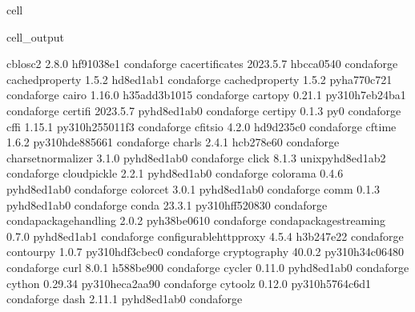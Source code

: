 \documentclass[letterpaper,table,10pt,english]{jupyterBook}
\begin{document}
\begin{sphinxuseclass}{cell}
\begin{sphinxVerbatimOutput}
\begin{sphinxuseclass}{cell_output}
\begin{sphinxVerbatim}[commandchars=\\\{\}]
c\PYGZhy{}blosc2                  2.8.0                hf91038e\PYGZus{}1    conda\PYGZhy{}forge
ca\PYGZhy{}certificates           2023.5.7             hbcca054\PYGZus{}0    conda\PYGZhy{}forge
cached\PYGZhy{}property           1.5.2                hd8ed1ab\PYGZus{}1    conda\PYGZhy{}forge
cached\PYGZus{}property           1.5.2              pyha770c72\PYGZus{}1    conda\PYGZhy{}forge
cairo                     1.16.0            h35add3b\PYGZus{}1015    conda\PYGZhy{}forge
cartopy                   0.21.1          py310h7eb24ba\PYGZus{}1    conda\PYGZhy{}forge
certifi                   2023.5.7           pyhd8ed1ab\PYGZus{}0    conda\PYGZhy{}forge
certipy                   0.1.3                      py\PYGZus{}0    conda\PYGZhy{}forge
cffi                      1.15.1          py310h255011f\PYGZus{}3    conda\PYGZhy{}forge
cfitsio                   4.2.0                hd9d235c\PYGZus{}0    conda\PYGZhy{}forge
cftime                    1.6.2           py310hde88566\PYGZus{}1    conda\PYGZhy{}forge
charls                    2.4.1                hcb278e6\PYGZus{}0    conda\PYGZhy{}forge
charset\PYGZhy{}normalizer        3.1.0              pyhd8ed1ab\PYGZus{}0    conda\PYGZhy{}forge
click                     8.1.3           unix\PYGZus{}pyhd8ed1ab\PYGZus{}2    conda\PYGZhy{}forge
cloudpickle               2.2.1              pyhd8ed1ab\PYGZus{}0    conda\PYGZhy{}forge
colorama                  0.4.6              pyhd8ed1ab\PYGZus{}0    conda\PYGZhy{}forge
colorcet                  3.0.1              pyhd8ed1ab\PYGZus{}0    conda\PYGZhy{}forge
comm                      0.1.3              pyhd8ed1ab\PYGZus{}0    conda\PYGZhy{}forge
conda                     23.3.1          py310hff52083\PYGZus{}0    conda\PYGZhy{}forge
conda\PYGZhy{}package\PYGZhy{}handling    2.0.2              pyh38be061\PYGZus{}0    conda\PYGZhy{}forge
conda\PYGZhy{}package\PYGZhy{}streaming   0.7.0              pyhd8ed1ab\PYGZus{}1    conda\PYGZhy{}forge
configurable\PYGZhy{}http\PYGZhy{}proxy   4.5.4                h3b247e2\PYGZus{}2    conda\PYGZhy{}forge
contourpy                 1.0.7           py310hdf3cbec\PYGZus{}0    conda\PYGZhy{}forge
cryptography              40.0.2          py310h34c0648\PYGZus{}0    conda\PYGZhy{}forge
curl                      8.0.1                h588be90\PYGZus{}0    conda\PYGZhy{}forge
cycler                    0.11.0             pyhd8ed1ab\PYGZus{}0    conda\PYGZhy{}forge
cython                    0.29.34         py310heca2aa9\PYGZus{}0    conda\PYGZhy{}forge
cytoolz                   0.12.0          py310h5764c6d\PYGZus{}1    conda\PYGZhy{}forge
dash                      2.11.1             pyhd8ed1ab\PYGZus{}0    conda\PYGZhy{}forge

\end{sphinxVerbatim}
\end{sphinxuseclass}
\end{sphinxVerbatimOutput}
\end{sphinxuseclass}
\end{document}

